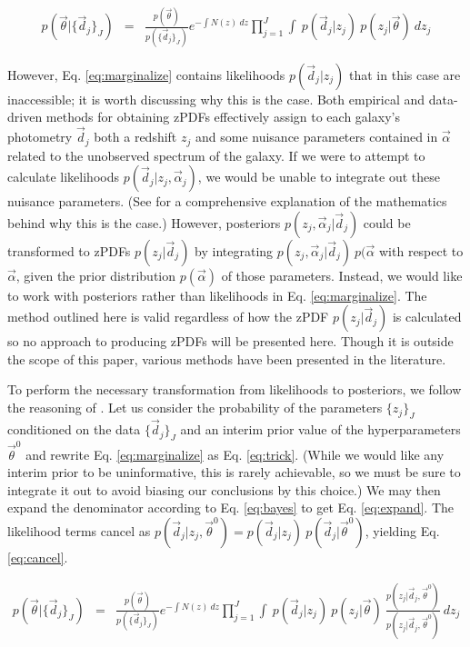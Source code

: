 \documentclass[preprint]{aastex}
\begin{document}
\begin{eqnarray}
\label{eq:marginalize}
p(\vec{\theta}|\{\vec{d}_{j}\}_{J}) &=& \frac{p(\vec{\theta})}{p(\{\vec{d}_{j}\}_{J})}e^{-\int N(z)\ dz}\prod_{j=1}^{J}\int\ p(\vec{d}_{j}|z_{j})\ p(z_{j}|\vec{\theta})\ dz_{j}
\end{eqnarray}

However, Eq. \ref{eq:marginalize} contains likelihoods $p(\vec{d}_{j}|z_{j})$ that in this case are inaccessible; it is worth discussing why this is the case.  Both empirical and data-driven methods for obtaining zPDFs effectively assign to each galaxy's photometry $\vec{d}_{j}$ both a redshift $z_{j}$ and some nuisance parameters contained in $\vec{\alpha}$ related to the unobserved spectrum of the galaxy.  If we were to attempt to calculate likelihoods $p(\vec{d}_{j}|z_{j},\vec{\alpha}_{j})$, we would be unable to integrate out these nuisance parameters.  (See \citet{hog12} for a comprehensive explanation of the mathematics behind why this is the case.)  However, posteriors $p(z_{j},\vec{\alpha}_{j}|\vec{d}_{j})$ could be transformed to zPDFs $p(z_{j}|\vec{d}_{j})$ by integrating $p(z_{j},\vec{\alpha}_{j}|\vec{d}_{j})\ p(\vec{\alpha}$ with respect to $\vec{\alpha}$, given the prior distribution $p(\vec{\alpha})$ of those parameters.  Instead, we would like to work with posteriors rather than likelihoods in Eq. \ref{eq:marginalize}.  The method outlined here is valid regardless of how the zPDF $p(z_{j}|\vec{d}_{j})$ is calculated so no approach to producing zPDFs will be presented here.  Though it is outside the scope of this paper, various methods have been presented in the literature. \citep{she11, bal08, car13, car14a}

To perform the necessary transformation from likelihoods to posteriors, we follow the reasoning of \citet{mar15}.  Let us consider the probability of the parameters $\{z_{j}\}_{J}$ conditioned on the data $\{\vec{d}_{j}\}_{J}$ and an interim prior value of the hyperparameters $\vec{\theta}^{0}$ and rewrite Eq. \ref{eq:marginalize} as Eq. \ref{eq:trick}.  (While we would like any interim prior to be uninformative, this is rarely achievable, so we must be sure to integrate it out to avoid biasing our conclusions by this choice.)  We may then expand the denominator according to Eq. \ref{eq:bayes} to get Eq. \ref{eq:expand}.  The likelihood terms cancel as $p(\vec{d}_{j}|z_{j},\vec{\theta}^{0})=p(\vec{d}_{j}|z_{j})\ p(\vec{d}_{j}|\vec{\theta}^{0})$, yielding Eq. \ref{eq:cancel}.

\begin{eqnarray}
\label{eq:trick}
p(\vec{\theta}|\{\vec{d}_{j}\}_{J}) &=& \frac{p(\vec{\theta})}{p(\{\vec{d}_{j}\}_{J})}e^{-\int N(z)\ dz}\prod_{j=1}^{J}\int\ p(\vec{d}_{j}|z_{j})\ p(z_{j}|\vec{\theta})\ \frac{p(z_{j}|\vec{d}_{j},\vec{\theta}^{0})}{p(z_{j}|\vec{d}_{j},\vec{\theta}^{0})}\ dz_{j}
\end{eqnarray}
\end{document}
